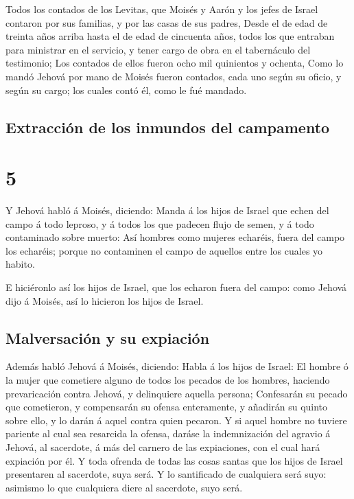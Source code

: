  Todos los contados de los Levitas, que Moisés y Aarón y
los jefes de Israel contaron por sus familias, y por las casas de sus
padres,  Desde el de edad de treinta años arriba hasta el
de edad de cincuenta años, todos los que entraban para ministrar en el
servicio, y tener cargo de obra en el tabernáculo del testimonio;
 Los contados de ellos fueron ocho mil quinientos y
ochenta,  Como lo mandó Jehová por mano de Moisés fueron
contados, cada uno según su oficio, y según su cargo; los cuales contó
él, como le fué mandado.

\hypertarget{extracciuxf3n-de-los-inmundos-del-campamento}{%
\subsection{Extracción de los inmundos del
campamento}\label{extracciuxf3n-de-los-inmundos-del-campamento}}

\hypertarget{section-4}{%
\section{5}\label{section-4}}

 Y Jehová habló á Moisés, diciendo:  Manda á
los hijos de Israel que echen del campo á todo leproso, y á todos los
que padecen flujo de semen, y á todo contaminado sobre muerto:
 Así hombres como mujeres echaréis, fuera del campo los
echaréis; porque no contaminen el campo de aquellos entre los cuales yo
habito.

 E hiciéronlo así los hijos de Israel, que los echaron
fuera del campo: como Jehová dijo á Moisés, así lo hicieron los hijos de
Israel.

\hypertarget{malversaciuxf3n-y-su-expiaciuxf3n}{%
\subsection{Malversación y su
expiación}\label{malversaciuxf3n-y-su-expiaciuxf3n}}

 Además habló Jehová á Moisés, diciendo: 
Habla á los hijos de Israel: El hombre ó la mujer que cometiere alguno
de todos los pecados de los hombres, haciendo prevaricación contra
Jehová, y delinquiere aquella persona;  Confesarán su
pecado que cometieron, y compensarán su ofensa enteramente, y añadirán
su quinto sobre ello, y lo darán á aquel contra quien pecaron.
 Y si aquel hombre no tuviere pariente al cual sea
resarcida la ofensa, daráse la indemnización del agravio á Jehová, al
sacerdote, á más del carnero de las expiaciones, con el cual hará
expiación por él.  Y toda ofrenda de todas las cosas
santas que los hijos de Israel presentaren al sacerdote, suya será.
 Y lo santificado de cualquiera será suyo: asimismo lo
que cualquiera diere al sacerdote, suyo será.

